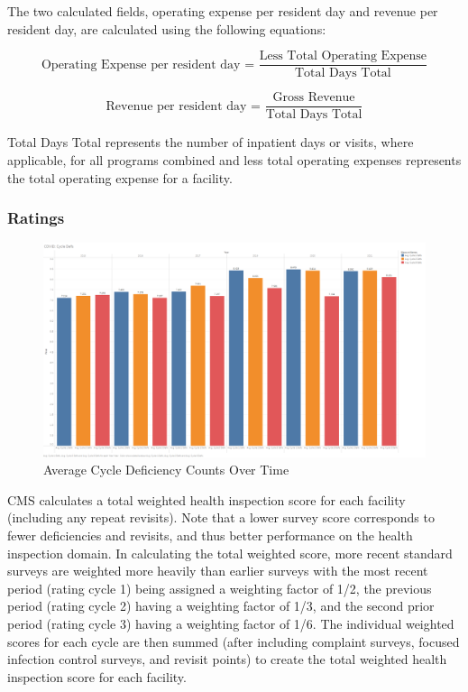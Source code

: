 \documentclass{article}
\theoremstyle{mytheoremstyle}
\theoremstyle{mytheoremstyle}
\theoremstyle{myproblemstyle}
\begin{document}
\noindent The two calculated fields, operating expense per resident day and revenue per resident day, are calculated using the following equations:

\[\text{Operating Expense per resident day = }\frac{\text{Less Total Operating Expense}}{\text{Total Days Total}}\]

\[\text{Revenue per resident day = }\frac{\text{Gross Revenue}}{\text{Total Days Total}}\]

\noindent Total Days Total represents the number of inpatient days or visits, where applicable, for all programs combined and less total operating expenses represents the total operating expense for a facility.

\pagebreak


\subsubsection{Ratings}

\begin{figure}[htbp]
\centering
\includegraphics[width=0.8\linewidth]{Images/COVID Cycle Defs.png}
\caption{Average Cycle Deficiency Counts Over Time}
\label{defs over time}
\end{figure}

CMS calculates a total weighted health inspection score for each facility (including any repeat revisits). Note that a lower survey score corresponds to fewer deficiencies and revisits, and thus better performance on the health inspection domain. In calculating the total weighted score, more recent standard surveys are weighted more heavily than earlier surveys with the most recent period (rating cycle 1) being assigned a weighting factor of 1/2, the previous period (rating cycle 2) having a weighting factor of 1/3, and the second prior period (rating cycle 3) having a weighting factor of 1/6. The individual weighted scores for each cycle are then summed (after including complaint surveys, focused infection control surveys, and revisit points) to create the total weighted health inspection score for each facility. 
\end{document}
